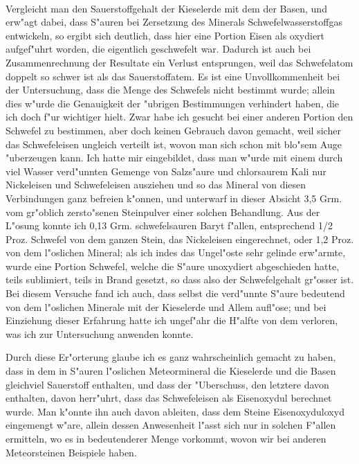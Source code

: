 \documentclass[a4paper, 11pt, oneside]{article}
\begin{document}
\paragraph{}
Vergleicht man den Sauerstoffgehalt der Kieselerde mit dem der Basen, und erw"agt dabei, dass S"auren bei Zersetzung des Minerals Schwefelwasserstoffgas entwickeln, so ergibt sich deutlich, dass hier eine Portion Eisen als oxydiert aufgef"uhrt worden, die eigentlich geschwefelt war. Dadurch ist auch bei Zusammenrechnung der Resultate ein Verlust entsprungen, weil das Schwefelatom doppelt so schwer ist als das Sauerstoffatem. Es ist eine Unvollkommenheit bei der Untersuchung, dass die Menge des Schwefels nicht bestimmt wurde; allein dies w"urde die Genauigkeit der "ubrigen Bestimmungen verhindert haben, die ich doch f"ur wichtiger hielt. Zwar habe ich gesucht bei einer anderen Portion den Schwefel zu bestimmen, aber doch keinen Gebrauch davon gemacht, weil sicher das Schwefeleisen ungleich verteilt ist, wovon man sich schon mit blo"sem Auge "uberzeugen kann. Ich hatte mir eingebildet, dass man w"urde mit einem durch viel Wasser verd"unnten Gemenge von Salzs"aure und chlorsaurem Kali nur Nickeleisen und Schwefeleisen ausziehen und so das Mineral von diesen Verbindungen ganz befreien k"onnen, und unterwarf in dieser Absicht 3,5 Grm. vom gr"oblich zersto"senen Steinpulver einer solchen Behandlung. Aus der L"osung konnte ich 0,13 Grm. schwefelsauren Baryt f"allen, entsprechend 1/2 Proz. Schwefel von dem ganzen Stein, das Nickeleisen eingerechnet, oder 1,2 Proz. von dem l"oslichen Mineral; als ich indes das Ungel"oste sehr gelinde erw"armte, wurde eine Portion Schwefel, welche die S"aure unoxydiert abgeschieden hatte, teils sublimiert, teils in Brand gesetzt, so dass also der Schwefelgehalt gr"osser ist. Bei diesem Versuche fand ich auch, dass selbst die verd"unnte S"aure bedeutend von dem l"oslichen Minerale mit der Kieselerde und Allem aufl"ose; und bei Einziehung dieser Erfahrung hatte ich ungef"ahr die H"alfte von dem verloren, was ich zur Untersuchung anwenden konnte.

Durch diese Er"orterung glaube ich es ganz wahrscheinlich gemacht zu haben, dass in dem in S"auren l"oslichen Meteormineral die Kieselerde und die Basen gleichviel Sauerstoff enthalten, und dass der "Uberschuss, den letztere davon enthalten, davon herr"uhrt, dass das Schwefeleisen als Eisenoxydul berechnet wurde. Man k"onnte ihn auch davon ableiten, dass dem Steine Eisenoxyduloxyd eingemengt w"are, allein dessen Anwesenheit l"asst sich nur in solchen F"allen ermitteln, wo es in bedeutenderer Menge vorkommt, wovon wir bei anderen Meteorsteinen Beispiele haben.
\end{document}
